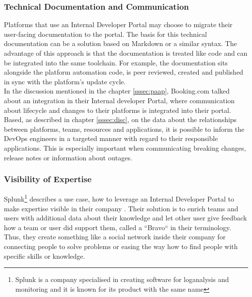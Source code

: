 \documentclass[a4paper,12pt]{article}
\begin{document}
    \subsubsection{Technical Documentation and Communication}
    \label{sssec:techdoc}
    Platforms that use an Internal Developer Portal may choose to migrate their user-facing documentation to the portal.
    The basis for this technical documentation can be a solution based on Markdown\parencite{backstagetechdocs}
    or a similar syntax.
    The advantage of this approach is that the documentation is treated like code and can be integrated into the same toolchain.
    For example, the documentation sits alongside the platform automation code, is peer reviewed, created
    and published in sync with the platform's update cycle.\\
    In the discussion mentioned in the chapter \ref{sssec:paap}, Booking.com talked about an integration in their Internal
    developer Portal, where communication about lifecycle and changes to their platforms is integrated into their portal.
    Based, as described in chapter \ref{sssec:disc}, on the data about the relationships between platforms, teams,
    resources and applications, it is possible to inform the DevOps engineers in a targeted manner with regard to their
    responsible applications.
    This is especially important when communicating breaking changes, release notes or information about outages.

    \subsubsection{Visibility of Expertise}
    \label{sssec:expertise}
    Splunk\footnote{Splunk is a company specialised in creating software for loganalysis and monitoring and it is known
    for its product with the same name}
    describes a use case, how to leverage an Internal Developer Portal to make expertise visible in their
    company\parencite{splunkidp} .
    Their solution is to enrich teams and users with additional data about their knowledge and let other user give feedback
    how a team or user did support them, called a ``Bravo`` in their terminology.
    Thus, they create something like a social network inside their company for connecting people to solve problems or
    easing the way how to find people with specific skills or knowledge.
\end{document}
